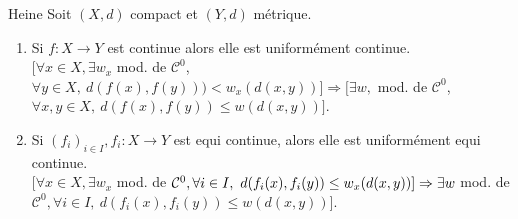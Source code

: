 \begin{theoreme}{Heine}
    Soit $(X,d)$ compact et $(Y,d)$ métrique.
    \begin{enumerate}
        \item Si $f:X\to Y$ est continue alors elle est uniformément continue.\\
            $[\forall x\in X,\exists w_x$ mod. de $\mathcal{C}^0$, $\forall y\in X,\ d(f(x),f(y)))<w_x(d(x,y))]\Rightarrow [\exists w,$ mod. de $\mathcal{C}^0$, $\forall x,y\in X,\ d(f(x),f(y))\le w(d(x,y))] $.

        \item Si $(f_i)_{i\in I}, f_i: X\to Y$ est equi continue, alors elle est uniformément equi continue.\\
            $[\forall x \in X, \exists w_x$ mod. de $\mathcal{C}^0, \forall i\in I,\ d(f_i(x),f_i(y))\le w_x(d(x,y))]\Rightarrow\\ \exists w$ mod. de $\mathcal{C}^0, \forall i\in I,\ d(f_i(x),f_i(y)) \leq w(d(x,y))] $.
    \end{enumerate}
\end{theoreme}
